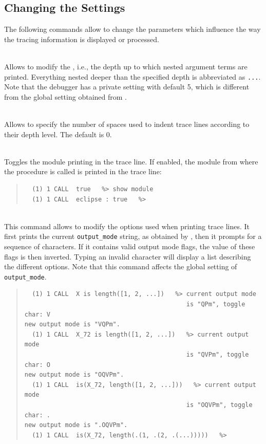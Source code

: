 \subsection{Changing the Settings}
The following commands allow to change the parameters which
influence the way the tracing information is displayed or processed.

\begin{descr}{1cm}

\\
Allows to modify the , i.e., the depth up to which
nested argument terms are printed. Everything nested deeper than the
specified depth is abbreviated as \verb:...:.
Note that the debugger has a private  setting with
default 5, which is different from the global setting obtained from
.

\\
Allows to specify the number of spaces used to indent trace lines according
to their depth level. The default is 0.

\\
Toggles the module printing in the trace line.
If enabled, the module from where the procedure is called
is printed in the trace line:
\begin{quote}
\begin{verbatim}
  (1) 1 CALL  true   %> show module
  (1) 1 CALL  eclipse : true   %>
\end{verbatim}
\end{quote}

\\
This command allows to modify the options used when printing trace lines.
It first prints the current {\tt output_mode} string, as obtained by
,
then it prompts for a sequence of characters.
If it contains valid output mode flags, the value
of these flags is then inverted.
Typing an invalid character will display a list describing the different
options.
Note that this command affects the global setting of {\tt output_mode}.

\begin{quote}
\begin{verbatim}
  (1) 1 CALL  X is length([1, 2, ...])   %> current output mode
                                            is "QPm", toggle char: V
new output mode is "VQPm".
  (1) 1 CALL  X_72 is length([1, 2, ...])   %> current output mode
                                            is "QVPm", toggle char: O
new output mode is "OQVPm".
  (1) 1 CALL  is(X_72, length([1, 2, ...]))   %> current output mode
                                            is "OQVPm", toggle char: .
new output mode is ".OQVPm".
  (1) 1 CALL  is(X_72, length(.(1, .(2, .(...)))))   %>
\end{verbatim}
\end{quote}


\end{descr}
